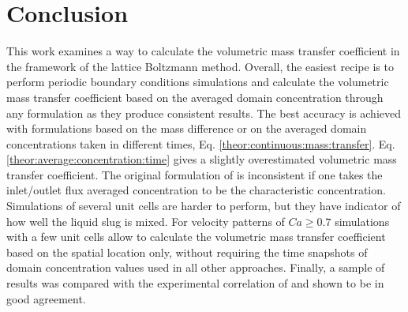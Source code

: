 \documentclass{article}
\begin{document}
\section{Conclusion}
This work examines a way to calculate the volumetric mass transfer coefficient in the framework of
the lattice Boltzmann method. Overall, the easiest recipe is to perform periodic boundary
conditions simulations and calculate the volumetric mass transfer coefficient based on the averaged
domain concentration through any formulation as they produce consistent results. The best accuracy
is achieved with formulations based on the mass difference or on the averaged domain concentrations
taken in different times, Eq. \ref{theor:continuous:mass:transfer}. Eq.
\ref{theor:average:concentration:time} gives a slightly overestimated volumetric mass transfer
coefficient. The original formulation of
\citet{vanbaten-circular} is inconsistent if one takes the inlet/outlet flux averaged concentration
to be the characteristic concentration. Simulations of several unit cells are harder to perform, but they
have indicator of how well the liquid slug is mixed.  For velocity patterns of $Ca\geq
0.7$ simulations with a few unit cells allow to calculate the volumetric mass transfer
coefficient based on the spatial location only, without requiring the time snapshots of domain concentration values used in all other
approaches. Finally, a sample of results was
compared with the experimental correlation of \citet{yue-mass} and shown to be in good agreement. 
\appendix
\end{document}

